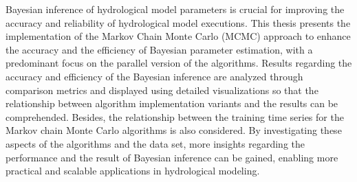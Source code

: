 Bayesian inference of hydrological model parameters is crucial for improving the accuracy and reliability of hydrological model executions. This thesis presents the implementation of the Markov Chain Monte Carlo (MCMC) approach to enhance the accuracy and the efficiency of Bayesian parameter estimation, with a predominant focus on the parallel version of the algorithms. Results regarding the accuracy and efficiency of the Bayesian inference are analyzed through comparison metrics and displayed using detailed visualizations so that the relationship between algorithm implementation variants and the results can be comprehended. Besides, the relationship between the training time series for the Markov chain Monte Carlo algorithms is also considered. By investigating these aspects of the algorithms and the data set, more insights regarding the performance and the result of Bayesian inference can be gained, enabling more practical and scalable applications in hydrological modeling.